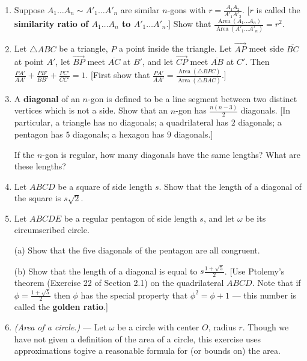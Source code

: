 \documentclass[leqno]{book}
\begin{document}
\begin{enumerate}
\item Suppose $A_1\dots A_n\sim A'_1\dots A'_n$ are similar $n$-gons with $r=\frac{A_1A_2}{A'_1A'_2}$.  [$r$ is called the \textbf{similarity ratio of $A_1\dots A_n$ to $A'_1\dots A'_n$}.]  Show that $\frac{\operatorname{Area}(A_1\dots A_n)}{\operatorname{Area}(A'_1\dots A'_n)}=r^2$.

\item Let $\triangle ABC$ be a triangle, $P$ a point inside the triangle.  Let $\overset{\longrightarrow}{AP}$ meet side $\overline{BC}$ at point $A'$, let $\overset{\longrightarrow}{BP}$ meet $\overline{AC}$ at $B'$, and let $\overset{\longrightarrow}{CP}$ meet $\overline{AB}$ at $C'$.  Then $\frac{PA'}{AA'}+\frac{PB'}{BB'}+\frac{PC'}{CC'}=1$.  [First show that $\frac{PA'}{AA'}=\frac{\operatorname{Area}(\triangle BPC)}{\operatorname{Area}(\triangle BAC)}$.]

\item A \textbf{diagonal} of an $n$-gon is defined to be a line segment between two distinct vertices which is not a side.  Show that an $n$-gon has $\frac{n(n-3)}2$ diagonals.  [In particular, a triangle has no diagonals; a quadrilateral has $2$ diagonals; a pentagon has $5$ diagonals; a hexagon has $9$ diagonals.]

If the $n$-gon is regular, how many diagonals have the same lengths?  What are these lengths?

\item Let $ABCD$ be a square of side length $s$.  Show that the length of a diagonal of the square is $s\sqrt 2$.

\item Let $ABCDE$ be a regular pentagon of side length $s$, and let $\omega$ be its circumscribed circle.

(a) Show that the five diagonals of the pentagon are all congruent.

(b) Show that the length of a diagonal is equal to $s\frac{1+\sqrt 5}2$.  [Use Ptolemy's theorem (Exercise 22 of Section 2.1) on the quadrilateral $ABCD$.  Note that if $\phi=\frac{1+\sqrt 5}2$ then $\phi$ has the special property that $\phi^2=\phi+1$ \---- this number is called the \textbf{golden ratio}.]

\item\emph{(Area of a circle.)} \---- Let $\omega$ be a circle with center $O$, radius $r$.  Though we have not given a definition of the area of a circle, this exercise uses approximations togive a reasonable formula for (or bounds on) the area.


\end{enumerate}
\end{document}
